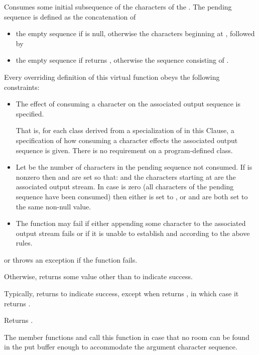 \begin{itemdescr}  %
\pnum
\effects
Consumes some initial subsequence of the characters of the
.
The pending sequence is defined as the concatenation of
\begin{itemize}
\item
the empty sequence if  is null, otherwise the
characters beginning at
, followed by
\item
the empty sequence
if
returns
, otherwise the sequence consisting of .
\end{itemize}

\pnum
\expects
Every overriding definition of this virtual function
obeys the following constraints:
\begin{itemize}
\item
The effect of consuming a character on the associated output sequence is
specified.
\begin{footnote}
That is, for each class derived from a specialization of
in this Clause,
a specification of how consuming a character effects the associated output sequence is given.
There is no requirement on a program-defined class.
\end{footnote}
\item
Let
be the number of characters in the pending sequence not consumed.
If
is nonzero then
and
are set so that:
and the  characters starting at
are the associated output stream.
In case   is zero (all characters of the pending sequence have been consumed)
then either
is set to
,
or
and
are both set to the same non-null value.
\item
The function may fail if either
appending some character to the associated output stream fails or
if it is unable to establish
and
according to the above rules.
\end{itemize}

\pnum
\returns
{}
or throws an exception
if the function fails.

Otherwise,
returns some value other than
to indicate success.
\begin{footnote}
Typically,
returns  to indicate success, except when
returns
,
in which case it returns
.
\end{footnote}

\pnum
{}
Returns
.

\pnum
\remarks
The member functions
and
call this function in case that
no room can be found in the put buffer enough to accommodate the
argument character sequence.
\end{itemdescr}

